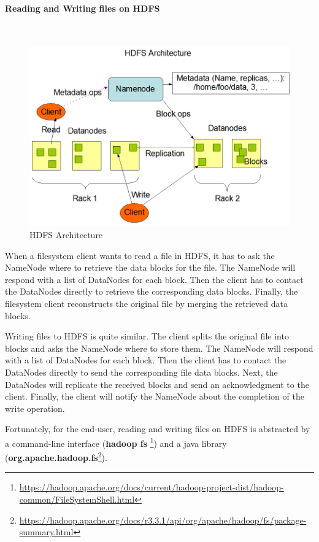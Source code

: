 \documentclass[12pt,english]{book}
\begin{document}
\paragraph{Reading and Writing files on HDFS}\mbox{}\\
 
\begin{figure}[t]
	\centering
	\includegraphics[width=\linewidth]{hdfsArch.png}
	\caption[HDFS Architecture]{HDFS Architecture \footnotemark}
\end{figure}

When a filesystem client wants to read a file in HDFS, it has to ask the NameNode where to retrieve the data blocks for the file.
The NameNode will respond with a list of DataNodes for each block.
Then the client has to contact the DataNodes directly to retrieve the corresponding data blocks.
Finally, the filesystem client reconstructs the original file by merging the retrieved data blocks.

Writing files to HDFS is quite similar.
The client splits the original file into blocks and asks the NameNode where to store them.
The NameNode will respond with a list of DataNodes for each block.
Then the client has to contact the DataNodes directly to send the corresponding file data blocks.
Next, the DataNodes will replicate the received blocks and send an acknowledgment to the client.
Finally, the client will notify the NameNode about the completion of the write operation.

Fortunately, for the end-user, reading and writing files on HDFS is abstracted by a command-line interface (\textbf{hadoop fs} \footnote{\url{https://hadoop.apache.org/docs/current/hadoop-project-dist/hadoop-common/FileSystemShell.html}}) and a java library (\textbf{org.apache.hadoop.fs}\footnote{\url{https://hadoop.apache.org/docs/r3.3.1/api/org/apache/hadoop/fs/package-summary.html}}).
\end{document}
